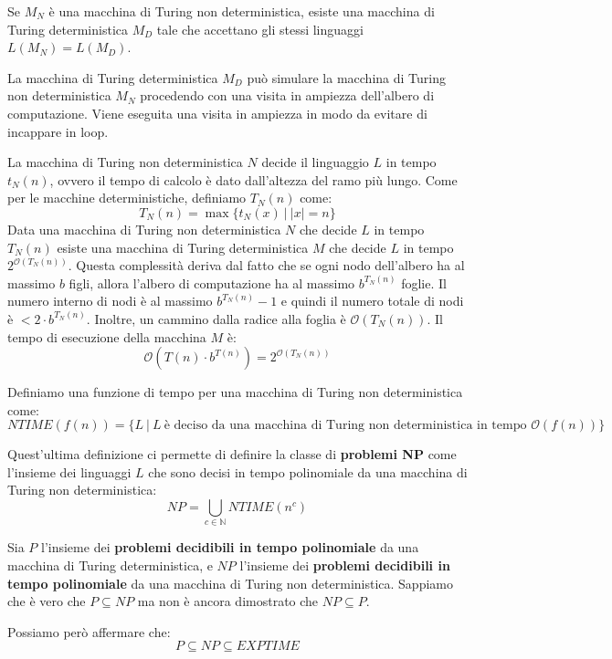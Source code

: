 \begin{teorema}
    Se $M_N$ è una macchina di Turing non deterministica, esiste una macchina di
    Turing deterministica $M_D$ tale che accettano gli stessi linguaggi $L(M_N)
        = L(M_D)$.
\end{teorema}
\begin{dimostrazione}
    La macchina di Turing deterministica $M_D$ può simulare la macchina di Turing
    non deterministica $M_N$ procedendo con una visita in ampiezza dell'albero
    di computazione. Viene eseguita una visita in ampiezza in modo da evitare di
    incappare in loop.
\end{dimostrazione}
La macchina di Turing non deterministica $N$ decide il linguaggio $L$ in tempo
$t_N(n)$, ovvero il tempo di calcolo è dato dall'altezza del ramo più lungo.
Come per le macchine deterministiche, definiamo $T_N(n)$ come:
\begin{equation}
    T_N(n) = \max \{t_N(x) \ | \ |x| = n\}
\end{equation}
Data una macchina di Turing non deterministica $N$ che decide $L$ in tempo
$T_N(n)$ esiste una macchina di Turing deterministica $M$ che decide $L$ in tempo
$2^{\mathcal{O}(T_N(n))}$. Questa complessità deriva dal fatto che se ogni nodo
dell'albero ha al massimo $b$ figli, allora l'albero di computazione ha al
massimo $b^{T_N(n)}$ foglie. Il numero interno di nodi è al massimo $b^{T_N(n)}
    - 1$ e quindi il numero totale di nodi è $< 2 \cdot b^{T_N(n)}$. Inoltre, un
cammino dalla radice alla foglia è $\mathcal{O}(T_N(n))$. Il tempo di esecuzione
della macchina $M$ è:
\begin{equation}
    \mathcal{O}(T(n) \cdot b^{T(n)}) = 2^{\mathcal{O}(T_N(n))}
\end{equation}
\begin{definizione}
    Definiamo una funzione di tempo per una macchina di Turing non deterministica
    come:
    \begin{equation}
        NTIME(f(n)) = \{L \ | \ L \ \text{è deciso da una macchina di Turing non
            deterministica in tempo } \mathcal{O}(f(n))\}
    \end{equation}
\end{definizione}
Quest'ultima definizione ci permette di definire la classe di \textbf{problemi NP}
come l'insieme dei linguaggi $L$ che sono decisi in tempo polinomiale da una
macchina di Turing non deterministica:
\begin{equation}
    NP = \bigcup_{c \in \mathbb{N}} NTIME(n^c)
\end{equation}
\begin{osservazione}
    Sia $P$ l'insieme dei \textbf{problemi decidibili in tempo polinomiale} da
    una macchina di Turing deterministica, e $NP$ l'insieme dei \textbf{problemi
        decidibili in tempo polinomiale} da una macchina di Turing non
    deterministica. Sappiamo che è vero che $P \subseteq NP$ ma non è ancora
    dimostrato che $NP \subseteq P$.
\end{osservazione}
Possiamo però affermare che:
\begin{equation}
    P \subseteq NP \subseteq EXPTIME
\end{equation}
